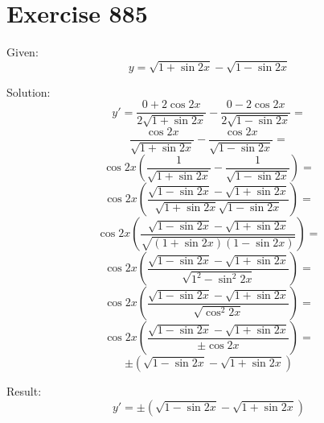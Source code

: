 \documentclass[a4paper, 10pt]{scrartcl}
\begin{document}
\section{Exercise 885}

Given:
\[
y = \sqrt{1 + \sin{2x}} - \sqrt{1 - \sin{2x}}
\]

Solution:
\[
y' = \frac{0 + 2\cos{2x}}{2\sqrt{1 + \sin{2x}}} - \frac{0 - 2\cos{2x}}{2\sqrt{1 - \sin{2x}}} =
\]
\[
\frac{\cos{2x}}{\sqrt{1 + \sin{2x}}} - \frac{\cos{2x}}{\sqrt{1 - \sin{2x}}} =
\]
\[
\cos{2x}\left(\frac{1}{\sqrt{1 + \sin{2x}}} - \frac{1}{\sqrt{1 - \sin{2x}}}\right) =
\]
\[
\cos{2x}\left(\frac{\sqrt{1 - \sin{2x}} - \sqrt{1 + \sin{2x}}}{\sqrt{1 + \sin{2x}}\sqrt{1 - \sin{2x}}}\right) =
\]
\[
\cos{2x}\left(\frac{\sqrt{1 - \sin{2x}} - \sqrt{1 + \sin{2x}}}{\sqrt{(1 + \sin{2x})(1 - \sin{2x})}}\right) =
\]
\[
\cos{2x}\left(\frac{\sqrt{1 - \sin{2x}} - \sqrt{1 + \sin{2x}}}{\sqrt{1^{2} - \sin^{2}{2x}}}\right) =
\]
\[
\cos{2x}\left(\frac{\sqrt{1 - \sin{2x}} - \sqrt{1 + \sin{2x}}}{\sqrt{\cos^{2}{2x}}}\right) =
\]
\[
\cos{2x}\left(\frac{\sqrt{1 - \sin{2x}} - \sqrt{1 + \sin{2x}}}{\pm\cos{2x}}\right) =
\]
\[
\pm(\sqrt{1 - \sin{2x}} - \sqrt{1 + \sin{2x}})
\]

Result:
\[
y' = \pm(\sqrt{1 - \sin{2x}} - \sqrt{1 + \sin{2x}})
\]
\end{document}
